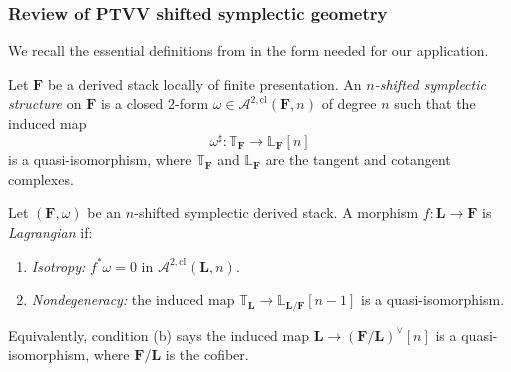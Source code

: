 \subsubsection{Review of PTVV shifted symplectic geometry}
\label{subsubsec:thqg-III-ptvv-review}

We recall the essential definitions from \cite{PTVV13} in the
form needed for our application.

\begin{definition}
\label{def:thqg-III-shifted-symplectic}
Let $\mathbf{F}$ be a derived stack locally of finite
presentation. An \emph{$n$-shifted symplectic structure} on
$\mathbf{F}$ is a closed $2$-form
$\omega \in \mathcal{A}^{2,\mathrm{cl}}(\mathbf{F}, n)$
of degree $n$ such that the induced map
\begin{equation}\label{eq:thqg-III-ptvv-nondegen}
\omega^{\sharp}
\colon
\mathbb{T}_{\mathbf{F}} \longrightarrow
\mathbb{L}_{\mathbf{F}}[n]
\end{equation}
is a quasi-isomorphism, where $\mathbb{T}_{\mathbf{F}}$ and
$\mathbb{L}_{\mathbf{F}}$ are the tangent and cotangent
complexes.
\end{definition}

\begin{definition}
\label{def:thqg-III-ptvv-lagrangian}
Let $(\mathbf{F}, \omega)$ be an $n$-shifted symplectic derived
stack. A morphism $f \colon \mathbf{L} \to \mathbf{F}$ is
\emph{Lagrangian} if:
\begin{enumerate}[label=\textup{(\alph*)}]
\item \emph{Isotropy:} $f^* \omega = 0$ in
 $\mathcal{A}^{2,\mathrm{cl}}(\mathbf{L}, n)$.
\item \emph{Nondegeneracy:} the induced map
 $\mathbb{T}_{\mathbf{L}} \to
 \mathbb{L}_{\mathbf{L}/\mathbf{F}}[n-1]$
 is a quasi-isomorphism.
\end{enumerate}
Equivalently, condition (b) says the induced map
$\mathbf{L} \to (\mathbf{F}/\mathbf{L})^{\vee}[n]$ is a
quasi-isomorphism, where $\mathbf{F}/\mathbf{L}$ is the
cofiber.
\end{definition}

